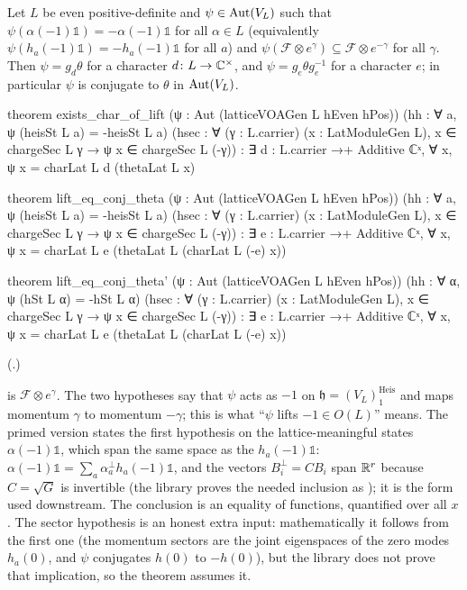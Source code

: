 \begin{theorem}[Rigidity]\label{ch03:thm:rigidity}
Let $L$ be even positive-definite and $\psi\in\operatorname{Aut}(V_L)$ such that $\psi(\alpha(-1)\mathbb 1)=
-\alpha(-1)\mathbb 1$ for all $\alpha\in L$ (equivalently $\psi(h_a(-1)\mathbb 1)=-h_a(-1)\mathbb1$
for all $a$) and $\psi(\mathcal F\otimes e^\gamma)\subseteq\mathcal F\otimes e^{-\gamma}$ for all
$\gamma$. Then $\psi=g_d\theta$ for a character $d\colon L\to{\mathbb{C}}^\times$, and $\psi=g_e\theta
g_e^{-1}$ for a character $e$; in particular $\psi$ is conjugate to $\theta$ in $\operatorname{Aut}(V_L)$.
\end{theorem}
\begin{leancode}
theorem exists_char_of_lift (ψ : Aut (latticeVOAGen L hEven hPos))
    (hh : ∀ a, ψ (heisSt L a) = -heisSt L a)
    (hsec : ∀ (γ : L.carrier) (x : LatModuleGen L), x ∈ chargeSec L γ → ψ x ∈ chargeSec L (-γ)) :
    ∃ d : L.carrier →+ Additive ℂˣ, ∀ x, ψ x = charLat L d (thetaLat L x)

theorem lift_eq_conj_theta (ψ : Aut (latticeVOAGen L hEven hPos))
    (hh : ∀ a, ψ (heisSt L a) = -heisSt L a)
    (hsec : ∀ (γ : L.carrier) (x : LatModuleGen L), x ∈ chargeSec L γ → ψ x ∈ chargeSec L (-γ)) :
    ∃ e : L.carrier →+ Additive ℂˣ, ∀ x, ψ x = charLat L e (thetaLat L (charLat L (-e) x))

theorem lift_eq_conj_theta' (ψ : Aut (latticeVOAGen L hEven hPos))
    (hh : ∀ α, ψ (hSt L α) = -hSt L α)
    (hsec : ∀ (γ : L.carrier) (x : LatModuleGen L), x ∈ chargeSec L γ → ψ x ∈ chargeSec L (-γ)) :
    ∃ e : L.carrier →+ Additive ℂˣ, ∀ x, ψ x = charLat L e (thetaLat L (charLat L (-e) x))
\end{leancode}
(.)

\begin{dictionary}
 is $\mathcal F\otimes e^\gamma$. The two hypotheses say that $\psi$ acts as
$-1$ on $\mathfrak h=(V_L)_1^{\text{Heis}}$ and maps momentum $\gamma$ to momentum $-\gamma$; this is
what ``$\psi$ lifts $-1\in O(L)$'' means. The primed version states the first hypothesis on the
lattice-meaningful states $\alpha(-1)\mathbb 1$, which span the same space as the $h_a(-1)\mathbb1$:
$\alpha(-1)\mathbb1=\sum_a\alpha^\perp_ah_a(-1)\mathbb1$, and the vectors $B_i^\perp=CB_i$ span
$\mathbb{R}^r$ because $C=\sqrt G$ is invertible (the library proves the needed inclusion as
); it is the form used downstream.
The conclusion is an equality of functions, quantified over all $x$. The sector hypothesis is an honest extra input: mathematically it follows from the first one
(the momentum sectors are the joint eigenspaces of the zero modes $h_a(0)$, and $\psi$ conjugates
$h(0)$ to $-h(0)$), but the library does not prove that implication, so the theorem assumes it.
\end{dictionary}


